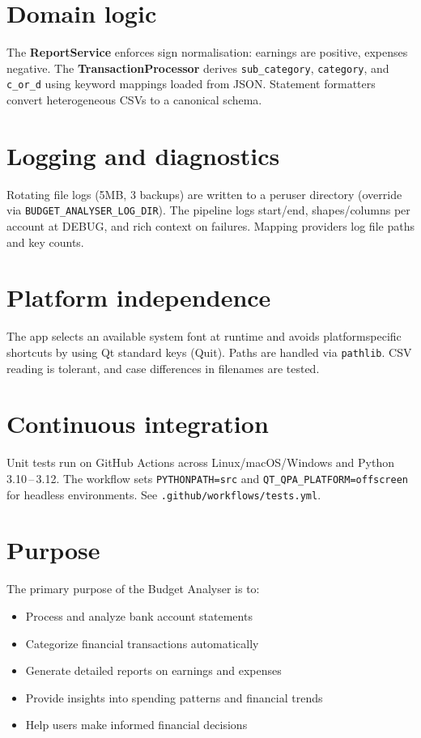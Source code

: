 \documentclass[11pt,a4paper]{report}
\begin{document}
\section{Domain logic}
The \textbf{ReportService} enforces sign normalisation: earnings are positive, expenses negative. The \textbf{TransactionProcessor} derives \texttt{sub\_category}, \texttt{category}, and \texttt{c\_or\_d} using keyword mappings loaded from JSON. Statement formatters convert heterogeneous CSVs to a canonical schema.

\section{Logging and diagnostics}
Rotating file logs (5MB, 3 backups) are written to a per\-user directory (override via \texttt{BUDGET\_ANALYSER\_LOG\_DIR}). The pipeline logs start/end, shapes/columns per account at DEBUG, and rich context on failures. Mapping providers log file paths and key counts.

\section{Platform independence}
The app selects an available system font at runtime and avoids platform\-specific shortcuts by using Qt standard keys (Quit). Paths are handled via \texttt{pathlib}. CSV reading is tolerant, and case differences in filenames are tested.

\section{Continuous integration}
Unit tests run on GitHub Actions across Linux/macOS/Windows and Python 3.10\,--\,3.12. The workflow sets \texttt{PYTHONPATH=src} and \texttt{QT\_QPA\_PLATFORM=offscreen} for headless environments. See \texttt{.github/workflows/tests.yml}.

\section{Purpose}
The primary purpose of the Budget Analyser is to:
\begin{itemize}
    \item Process and analyze bank account statements
    \item Categorize financial transactions automatically
    \item Generate detailed reports on earnings and expenses
    \item Provide insights into spending patterns and financial trends
    \item Help users make informed financial decisions
\end{itemize}
\end{document}
